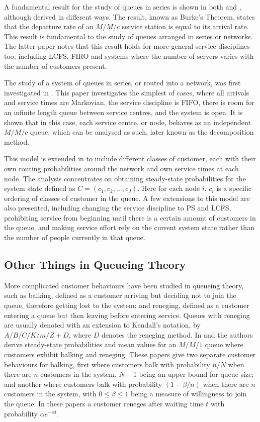 \documentclass{article}
\begin{document}
A fundamental result for the study of queues in series is shown in both \cite{burke56} and \cite{reich57}, although derived in different ways.
The result, known as Burke's Theorem, states that the departure rate of an $M/M/c$ service station is equal to its arrival rate.
This result is fundamental to the study of queues arranged in series or networks.
The latter paper notes that this result holds for more general service disciplines too, including LCFS, FIRO and systems where the number of servers varies with the number of customers present.

The study of a system of queues in series, or routed into a network, was first investigated in \cite{jackson57}.
This paper investigates the simplest of cases, where all arrivals and service times are Markovian, the service discipline is FIFO, there is room for an infinite length queue between service centres, and the system is open.
It is shown that in this case, each service centre, or node, behaves as an independent $M/M/c$ queue, which can be analysed as such, later known as the decomposition method.

This model is extended in \cite{kelly75} to include different classes of customer, each with their own routing probabilities around the network and own service times at each node.
The analysis concentrates on obtaining steady-state probabilities for the system state defined as $C = (c_1, c_2, ... , c_J)$.
Here for each node $i$, $c_i$ is a specific ordering of classes of customer in the queue.
A few extensions to this model are also presented, including changing the service discipline to PS and LCFS, prohibiting service from beginning until there is a certain amount of customers in the queue, and making service effort rely on the current system state rather than the number of people currently in that queue.

\subsection{Other Things in Queueing Theory}
More complicated customer behaviours have been studied in queueing theory, such as balking, defined as a customer arriving but deciding not to join the queue, therefore getting lost to the system; and reneging, defined as a customer entering a queue but then leaving before entering service.
Queues with reneging are usually denoted with an extension to Kendall's notation, by $A/B/C/K/m/Z + D$, where $D$ denotes the reneging method.
In \cite{anckerjrgafarian63a} and \cite{anckerjrgafarian63b} the authors derive steady-state probabilities and mean values for an $M/M/1$ queue where customers exhibit balking and reneging.
These papers give two separate customer behaviours for balking, first where customers balk with probability $n/N$ when there are $n$ customers in the system, $N-1$ being an upper bound for queue size; and another where customers balk with probability $(1-\beta/n)$ when there are $n$ customers in the system, with $0\leq\beta\leq1$ being a measure of willingness to join the queue.
In these papers a customer reneges after waiting time $t$ with probability $\alpha e^{-\alpha t}$.
\end{document}
